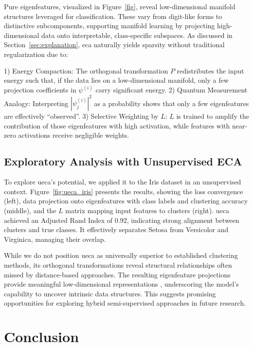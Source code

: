 \documentclass[lettersize,journal]{IEEEtran}
\begin{document}
Pure eigenfeatures, visualized in Figure~\ref{fig}, reveal low-dimensional manifold structures leveraged for classification. These vary from digit-like forms to distinctive subcomponents, supporting manifold learning by projecting high-dimensional data onto interpretable, class-specific subspaces. 
As discussed in Section~\ref{sec:explanation}, \gls{eca} naturally yields sparsity without traditional regularization due to:

1) Energy Compaction: 
The orthogonal transformation \(P\) redistributes the input energy such that, if the data lies on a low-dimensional manifold, only a few projection coefficients in \(\psi^{(i)}\) carry significant energy.
2) Quantum Measurement Analogy: Interpreting \( |\psi_j^{(i)}|^2 \) as a probability shows that only a few eigenfeatures are effectively ``observed''.
3) Selective Weighting by \(L\): \(L\) is trained to amplify the contribution of those eigenfeatures with high activation, while features with near-zero activations receive negligible weights.



\subsection{Exploratory Analysis with Unsupervised ECA}

To explore \gls{ueca}'s potential, we applied it to the Iris dataset in an unsupervised context. Figure~\ref{fig:ueca_iris} presents the results, showing the loss convergence (left), data projection onto eigenfeatures with class labels and clustering accuracy (middle), and the $L$ matrix mapping input features to clusters (right). \gls{ueca} achieved an Adjusted Rand Index of $0.92$, indicating strong alignment between clusters and true classes. It effectively separates Setosa from Versicolor and Virginica, managing their overlap.

While we do not position \gls{ueca} as universally superior to established clustering methods,
its orthogonal transformations reveal structural relationships often missed by distance-based approaches.
The resulting eigenfeature projections provide meaningful low-dimensional representations
, underscoring the model's capability to uncover intrinsic data structures.
This suggests promising opportunities for exploring hybrid semi-supervised approaches in future research.

\section{Conclusion}
\end{document}
